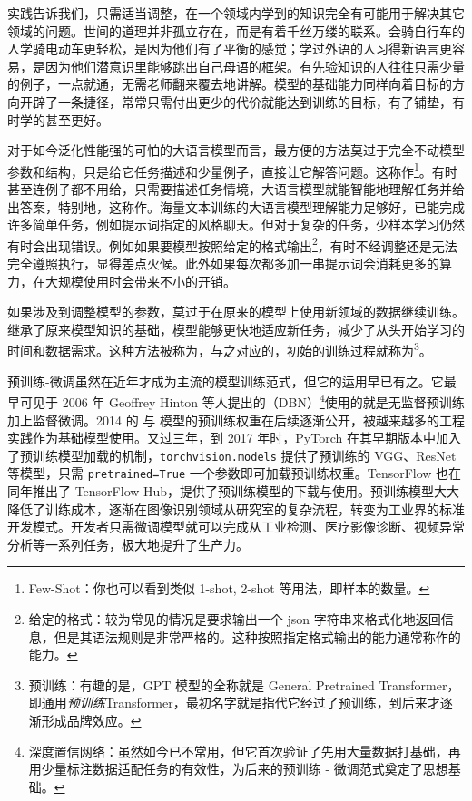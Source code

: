 实践告诉我们，只需适当调整，在一个领域内学到的知识完全有可能用于解决其它领域的问题。世间的道理并非孤立存在，而是有着千丝万缕的联系。会骑自行车的人学骑电动车更轻松，是因为他们有了平衡的感觉；学过外语的人习得新语言更容易，是因为他们潜意识里能够跳出自己母语的框架。有先验知识的人往往只需少量的例子，一点就通，无需老师翻来覆去地讲解。模型的基础能力同样向着目标的方向开辟了一条捷径，常常只需付出更少的代价就能达到训练的目标，有了铺垫，有时学的甚至更好。

对于如今泛化性能强的可怕的大语言模型而言，最方便的方法莫过于完全不动模型参数和结构，只是给它任务描述和少量例子，直接让它解答问题。这称作\footnote{Few-Shot：你也可以看到类似 1-shot, 2-shot 等用法，即样本的数量。}。有时甚至连例子都不用给，只需要描述任务情境，大语言模型就能智能地理解任务并给出答案，特别地，这称作。海量文本训练的大语言模型理解能力足够好，已能完成许多简单任务，例如提示词指定的风格聊天。但对于复杂的任务，少样本学习仍然有时会出现错误。例如如果要模型按照给定的格式输出\footnote{给定的格式：较为常见的情况是要求输出一个 json 字符串来格式化地返回信息，但是其语法规则是非常严格的。这种按照指定格式输出的能力通常称作的能力。}，有时不经调整还是无法完全遵照执行，显得差点火候。此外如果每次都多加一串提示词会消耗更多的算力，在大规模使用时会带来不小的开销。

如果涉及到调整模型的参数，莫过于在原来的模型上使用新领域的数据继续训练。继承了原来模型知识的基础，模型能够更快地适应新任务，减少了从头开始学习的时间和数据需求。这种方法被称为，与之对应的，初始的训练过程就称为\footnote{预训练：有趣的是，GPT 模型的全称就是 General Pretrained Transformer，即通用\emph{预训练}Transformer，最初名字就是指代它经过了预训练，到后来才逐渐形成品牌效应。}。

预训练-微调虽然在近年才成为主流的模型训练范式，但它的运用早已有之。它最早可见于 2006 年 Geoffrey Hinton 等人提出的（DBN）\footnote{深度置信网络：虽然如今已不常用，但它首次验证了先用大量数据打基础，再用少量标注数据适配任务的有效性，为后来的预训练 - 微调范式奠定了思想基础。}使用的就是无监督预训练加上监督微调。2014 的 与 模型的预训练权重在后续逐渐公开，被越来越多的工程实践作为基础模型使用。又过三年，到 2017 年时，PyTorch 在其早期版本中加入了预训练模型加载的机制，\texttt{torchvision.models} 提供了预训练的 VGG、ResNet 等模型，只需 \texttt{pretrained=True} 一个参数即可加载预训练权重。TensorFlow 也在同年推出了 TensorFlow Hub，提供了预训练模型的下载与使用。预训练模型大大降低了训练成本，逐渐在图像识别领域从研究室的复杂流程，转变为工业界的标准开发模式。开发者只需微调模型就可以完成从工业检测、医疗影像诊断、视频异常分析等一系列任务，极大地提升了生产力。

